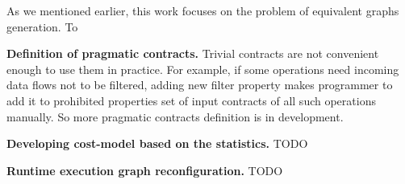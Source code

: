 As we mentioned earlier, this work focuses on the problem of equivalent graphs generation. To  

\textbf{Definition of pragmatic contracts.}
Trivial contracts are not convenient enough to use them in practice.
For example, if some operations need incoming data flows not to be filtered, adding new filter property makes programmer to add it to prohibited properties set of input contracts of all such operations manually.
So more pragmatic contracts definition is in development.

\textbf{Developing cost-model based on the statistics.}
TODO

\textbf{Runtime execution graph reconfiguration.}
TODO











